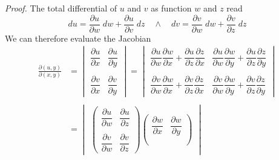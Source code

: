 \documentclass[../../../main.tex]{subfiles}
\begin{document}
\emph{Proof.} The total differential of $u$ and $v$ as function $w$ and $z$ read
\begin{equation*}
    du=\frac{\partial u}{\partial w}\;dw+ \frac{\partial u}{\partial v}\;dz\quad\land\quad
    dv=\frac{\partial v}{\partial w}\;dw+ \frac{\partial v}{\partial z}\;dz
\end{equation*}
We can therefore evaluate the Jacobian
\begin{align*}
    \frac{\partial (u,y)}{\partial (x,y)} & =\begin{vmatrix}
                                                 \dfrac{\partial u}{\partial x} & \dfrac{\partial u}{\partial y}
                                                 \\\\
                                                 \dfrac{\partial v}{\partial x} & \dfrac{\partial v}{\partial y}
                                             \end{vmatrix}=
    \begin{vmatrix}
        \dfrac{\partial u}{\partial w} \dfrac{\partial w}{\partial x}+ \dfrac{\partial u}{\partial z} \dfrac{\partial z}{\partial x} & \dfrac{\partial u}{\partial w}\dfrac{\partial w}{\partial y} + \dfrac{\partial u}{\partial z} \dfrac{\partial z}{\partial y}
        \\\\
        \dfrac{\partial v}{\partial w}\dfrac{\partial w}{\partial x} + \dfrac{\partial v}{\partial z} \dfrac{\partial z}{\partial x} & \dfrac{\partial v}{\partial w}\dfrac{\partial w}{\partial y} +\dfrac{\partial v}{\partial z} \dfrac{\partial z}{\partial y}
    \end{vmatrix}
    \\\\
                                          & =\begin{vmatrix}
                                                 \begin{pmatrix}
            \dfrac{\partial u}{\partial w} & \dfrac{\partial u}{\partial z}
            \\\\
            \dfrac{\partial v}{\partial w} & \dfrac{\partial v}{\partial z}
        \end{pmatrix}
                                                 \begin{pmatrix}
            \dfrac{\partial w}{\partial x} & \dfrac{\partial w}{\partial y}
            \\\\

\end{pmatrix}
\end{vmatrix}
\end{align*}
\end{document}
